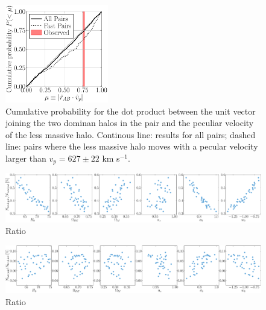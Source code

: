 \documentclass[onecolumn]{aastex62}
\begin{document}
\begin{figure}
\begin{center}
  \includegraphics[width=0.4\textwidth]{cumulative_alignment_06.pdf}
\end{center}
\caption{Cumulative probability for the dot product between the unit
  vector joining the two dominan halos in the pair and the peculiar
  velocity of the less massive halo.
  Continous line: results for all pairs; dashed line: pairs where the
  less massive halo moves with a pecular velocity larger than
  $v_p=627\pm22$ km s$^{-1}$.}
\label{fig:alignment}
\end{figure}

\begin{figure}
\begin{center}
  \includegraphics[width=1.0\textwidth]{ratio_pair_total_ind_total.pdf}
\end{center}
\caption{Ratio}
\label{fig:ratio_total}
\end{figure}

\begin{figure}
\begin{center}
  \includegraphics[width=1.0\textwidth]{ratio_pair_high_ind_total.pdf}
\end{center}
\caption{Ratio}
\label{fig:ratio_fast}
\end{figure}
\end{document}
